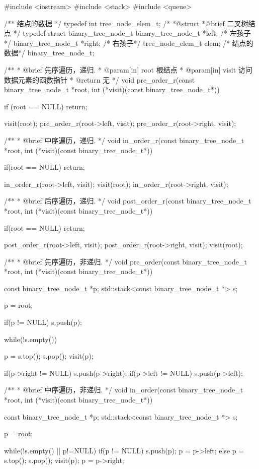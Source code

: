 \begin{Codex}[label=binary_tree.cpp]
#include <iostream>
#include <stack>
#include <queue>

/** 结点的数据 */
typedef int tree_node_elem_t;
 /*
  *@struct
  *@brief 二叉树结点
  */
typedef struct binary_tree_node_t {
    binary_tree_node_t *left;   /* 左孩子*/
    binary_tree_node_t *right;   /* 右孩子*/
    tree_node_elem_t elem; /* 结点的数据*/
} binary_tree_node_t;

/**
  * @brief 先序遍历，递归.
  * @param[in] root 根结点
  * @param[in] visit 访问数据元素的函数指针
  * @return 无
  */
void pre_order_r(const binary_tree_node_t *root,
                 int (*visit)(const binary_tree_node_t*)) {
    if (root == NULL) return;

    visit(root);
    pre_order_r(root->left, visit);
    pre_order_r(root->right, visit);
}

/**
  * @brief 中序遍历，递归.
  */
void in_order_r(const binary_tree_node_t *root,
                int (*visit)(const binary_tree_node_t*)) {
    if(root == NULL) return;

    in_order_r(root->left, visit);
    visit(root);
    in_order_r(root->right, visit);
}

/**
  * @brief 后序遍历，递归.
  */
void post_order_r(const binary_tree_node_t *root,
                  int (*visit)(const binary_tree_node_t*)) {
    if(root == NULL) return;

    post_order_r(root->left, visit);
    post_order_r(root->right, visit);
    visit(root);
}

/**
 * @brief 先序遍历，非递归.
 */
void pre_order(const binary_tree_node_t *root,
               int (*visit)(const binary_tree_node_t*)) {
    const binary_tree_node_t *p;
    std::stack<const binary_tree_node_t *> s;

    p = root;

    if(p != NULL) s.push(p);

    while(!s.empty()) {
        p = s.top();
        s.pop();
        visit(p);

        if(p->right != NULL) s.push(p->right);
        if(p->left != NULL) s.push(p->left);
    }
}

/**
 * @brief 中序遍历，非递归.
 */
void in_order(const binary_tree_node_t *root,
              int (*visit)(const binary_tree_node_t*)) {
    const binary_tree_node_t *p;
    std::stack<const binary_tree_node_t *> s;

    p = root;

    while(!s.empty() || p!=NULL) {
        if(p != NULL) {
            s.push(p);
            p = p->left;
        } else {
            p = s.top();
            s.pop();
            visit(p);
            p = p->right;
        }
    }
}


\end{Codex}

